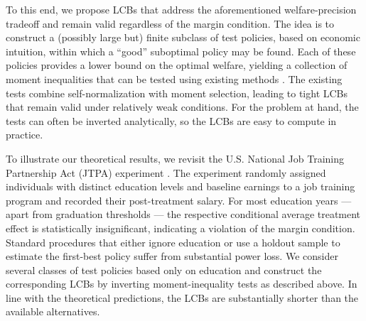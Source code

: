 \documentclass[12pt]{article}
\numberwithin{equation}{section}
\theoremstyle{plain}                         %
\theoremstyle{definition}                  %
\theoremstyle{remark}                      %
\begin{document}
To this end, we propose LCBs that address the aforementioned welfare-precision tradeoff and remain valid regardless of the margin condition. The idea is to construct a (possibly large but) finite subclass of test policies, based on economic intuition, within which a ``good'' suboptimal policy may be found. Each of these policies provides a lower bound on the optimal welfare, yielding a collection of moment inequalities that can be tested using existing methods \citep{andrews2010inference, CLR, romano2014practical, canay2017practical}. The existing tests combine self-normalization \citep[precision correction in][]{CLR} with moment selection, leading to tight LCBs that remain valid under relatively weak conditions. For the problem at hand, the tests can often be inverted analytically, so the LCBs are easy to compute in practice. 

To illustrate our theoretical results, we revisit the U.S. National Job Training Partnership Act (JTPA) experiment \citet{Bloom1997}. 
The experiment randomly assigned individuals with distinct education levels and baseline earnings to a job training program and recorded their post-treatment salary. 
For most education years --- apart from graduation thresholds --- the respective conditional average treatment effect is statistically insignificant, 
indicating a violation of the margin condition. Standard procedures that either ignore education or use a holdout sample to estimate the first-best policy suffer from substantial power loss. 
We consider several classes of test policies based only on education and construct the corresponding LCBs by inverting moment-inequality tests as described above. In line with the theoretical predictions, the LCBs are substantially shorter than the available alternatives. 

\end{document}

